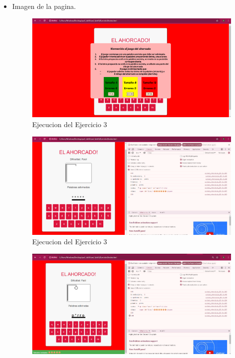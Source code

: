 \documentclass{article}
\begin{document}
	\begin{itemize}	
		\item Imagen de la pagina.
		\begin{figure}[H]
            \centering
            \includegraphics[width=\textwidth]{img/pag3}
            \caption{Ejecucion del Ejercicio 3}
            \label{fig:pagina}
        \end{figure}
        		\begin{figure}[H]
            \centering
            \includegraphics[width=\textwidth]{img/pag4}
            \caption{Ejecucion del Ejercicio 3}
            \label{fig:pagina}
        \end{figure}
        		\begin{figure}[H]
            \centering
            \includegraphics[width=\textwidth]{img/pag5}

\end{figure}
\end{itemize}
\end{document}

